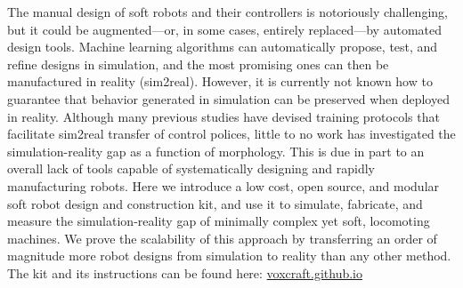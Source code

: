 % 
% 
\noindent
The manual design of soft robots and their controllers is notoriously challenging, but it could be augmented---or, in some cases, entirely replaced---by automated design tools. 
Machine learning algorithms can automatically propose, test, and refine designs in simulation, and the most promising ones can then be manufactured in reality (sim2real).
However, it is currently not known how to guarantee that behavior generated in simulation can be preserved when deployed in reality.
Although many previous studies have devised training protocols that facilitate sim2real transfer of control polices, little to no work has investigated the simulation-reality gap as a function of morphology.
This is due in part to an overall lack of tools capable of systematically designing and rapidly manufacturing robots.
Here we introduce a low cost, open source, and modular soft robot design and construction kit, and use it to simulate, fabricate, and measure the simulation-reality gap of minimally complex yet soft, locomoting machines.
We prove the scalability of this approach by transferring an order of magnitude more robot designs from simulation to reality than any other method. 
The kit and its instructions can be found here:
\href{https://voxcraft.github.io/}{\color{blue}voxcraft.github.io} 
%



